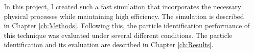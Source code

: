 In this project, I created such a fast simulation that incorporates the necessary physical processes while maintaining high efficiency.
The simulation is described in Chapter \ref{ch:Methods}.
Following this, the particle identification performance of this technique was evaluated under several different conditions.
The particle identification and its evaluation are described in Chapter \ref{ch:Results}.

\endinput

Any text after an \endinput is ignored.
You could put scraps here or things in progress.
